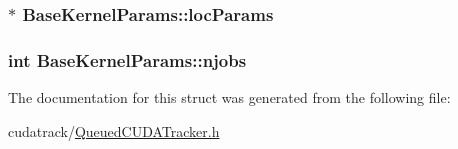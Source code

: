 \subsubsection[{\texorpdfstring{loc\+Params}{locParams}}]{$\ast$ Base\+Kernel\+Params\+::loc\+Params}\hypertarget{struct_base_kernel_params_a199494e0d0548c8b69ee23350e6ece95}{}\label{struct_base_kernel_params_a199494e0d0548c8b69ee23350e6ece95}
\subsubsection[{\texorpdfstring{njobs}{njobs}}]{\setlength{\rightskip}{0pt plus 5cm}int Base\+Kernel\+Params\+::njobs}\hypertarget{struct_base_kernel_params_aec40d44810d0e0a6640c66038af1fbf2}{}\label{struct_base_kernel_params_aec40d44810d0e0a6640c66038af1fbf2}


The documentation for this struct was generated from the following file\+:\begin{DoxyCompactItemize}
\item 
cudatrack/\hyperlink{_queued_c_u_d_a_tracker_8h}{Queued\+C\+U\+D\+A\+Tracker.\+h}\end{DoxyCompactItemize}
